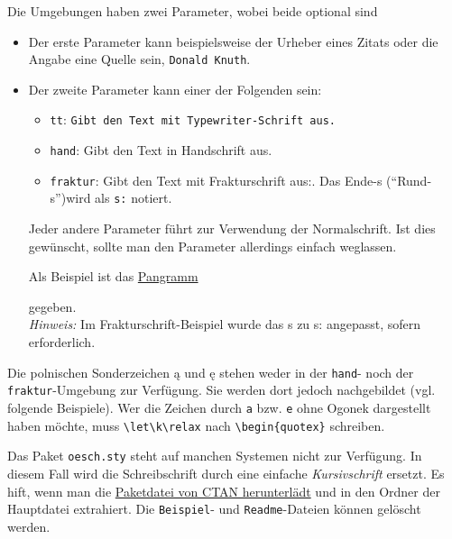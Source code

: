 			Die Umgebungen haben zwei Parameter, wobei beide optional sind
			\begin{itemize}
				\item Der erste Parameter kann beispielsweise der Urheber eines Zitats oder die Angabe eine Quelle sein, \zb \texttt{Donald Knuth}.
				\item Der zweite Parameter kann einer der Folgenden sein:
					\begin{itemize}
						\item \texttt{tt}: {\tt Gibt den Text mit Typewriter-Schrift aus.}
						\item \texttt{hand}: {\oeschfamily Gibt den Text in Handschrift aus.}
						\item \texttt{fraktur}: {\frakfamily Gibt den Text mit Frakturschrift aus:.} Das Ende-s ("`Rund-s"')wird als \verb|s:| notiert.
					\end{itemize}
					Jeder andere Parameter führt zur Verwendung der Normalschrift. Ist dies gewünscht, sollte man den Parameter allerdings einfach weglassen. 
					
					\newpage
					Als Beispiel ist das \href{https://de.wikipedia.org/wiki/Pangramm\#Liste_deutscher_Pangramme}{Pangramm} 
					\begin{quote}
						\pangramm
					\end{quote}
					gegeben.\\
					\emph{Hinweis:} Im Frakturschrift-Beispiel wurde das {\frakfamily s} zu {\frakfamily s:} angepasst, sofern erforderlich.
			\end{itemize}
			
			\begin{redbox}
				Die polnischen Sonderzeichen \k a und \k e stehen weder in der \texttt{hand}- noch der \texttt{fraktur}-Umgebung zur Verfügung. Sie werden dort jedoch nachgebildet (vgl. folgende Beispiele). Wer die Zeichen durch \texttt{a} bzw. \texttt{e} ohne Ogonek dargestellt haben möchte, muss \verb|\let\k\relax| nach \texttt{\textbackslash begin\{quotex\}} schreiben. 
			\end{redbox}
			
			\begin{redbox}
				Das Paket \texttt{oesch.sty} steht auf manchen Systemen nicht zur Verfügung. In diesem Fall wird die {\oeschfamily Schreibschrift} durch eine einfache \emph{Kursivschrift} ersetzt. Es hift, wenn man die \href{https://www.ctan.org/tex-archive/fonts/oesch?lang=de}{Paketdatei von CTAN herunterlädt} und in den Ordner der Hauptdatei extrahiert. Die \texttt{Beispiel}- und \texttt{Readme}-Dateien können gelöscht werden.
			\end{redbox}
			
